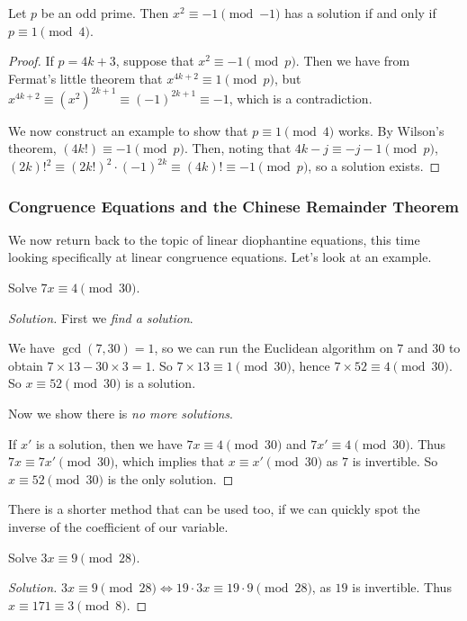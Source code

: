 \begin{lemma}[$x^2 + 1$ Lemma]
	Let $p$ be an odd prime. Then $x^2 \equiv -1 \pmod{-1}$ has a solution if and only if $p \equiv 1 \pmod{4}$.
\end{lemma}
\begin{proof}
	If $p = 4k + 3$, suppose that $x^2 \equiv -1 \pmod{p}$. Then we have from Fermat's little theorem that $x^{4k + 2} \equiv 1 \pmod{p}$, but $x^{4k + 2} \equiv (x^2)^{2k + 1} \equiv (-1)^{2k + 1} \equiv -1$, which is a contradiction.

	We now construct an example to show that $p \equiv 1 \pmod{4}$ works. By Wilson's theorem, $(4k!) \equiv -1 \pmod{p}$. Then, noting that $4k - j \equiv -j - 1 \pmod{p}$, $(2k)!^2 \equiv (2k!)^2 \cdot (-1)^{2k} \equiv (4k)! \equiv -1 \pmod{p}$, so a solution exists.
\end{proof}

\subsubsection{Congruence Equations and the Chinese Remainder Theorem}

We now return back to the topic of linear diophantine equations, this time looking specifically at linear congruence equations. Let's look at an example. 

\begin{example}
	Solve $7x \equiv 4 \pmod{30}$.
\end{example}
\begin{proof}[Solution]
	First we \emph{find a solution}.

	We have $\gcd(7, 30) = 1$, so we can run the Euclidean algorithm on $7$ and $30$ to obtain $7 \times 13 - 30 \times 3 = 1$. So $7 \times 13 \equiv 1 \pmod{30}$, hence $7 \times 52 \equiv 4 \pmod{30}$. So $x \equiv 52 \pmod{30}$ is a solution.

	Now we show there is \emph{no more solutions}.

	If $x'$ is a solution, then we have $7x \equiv 4 \pmod{30}$ and $7x' \equiv 4 \pmod{30}$. Thus $7x \equiv 7x' \pmod{30}$, which implies that $x \equiv x' \pmod{30}$ as $7$ is invertible.
	So $x \equiv 52 \pmod{30}$ is the only solution.
\end{proof}

There is a shorter method that can be used too, if we can quickly spot the inverse of the coefficient of our variable.

\begin{example}
	Solve $3x \equiv 9 \pmod{28}$.
\end{example}
\begin{proof}[Solution]
	$3x \equiv 9 \pmod{28} \iff 19 \cdot 3 x \equiv 19 \cdot 9 \pmod{28}$, as $19$ is invertible. Thus $x \equiv 171 \equiv 3 \pmod{8}$.
\end{proof}

